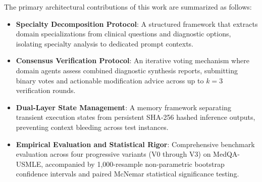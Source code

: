 The primary architectural contributions of this work are summarized as follows:
\begin{itemize}
    \item \textbf{Specialty Decomposition Protocol}: A structured framework that extracts domain specializations from clinical questions and diagnostic options, isolating specialty analysis to dedicated prompt contexts.
    \item \textbf{Consensus Verification Protocol}: An iterative voting mechanism where domain agents assess combined diagnostic synthesis reports, submitting binary votes and actionable modification advice across up to $k=3$ verification rounds.
    \item \textbf{Dual-Layer State Management}: A memory framework separating transient execution states from persistent SHA-256 hashed inference outputs, preventing context bleeding across test instances.
    \item \textbf{Empirical Evaluation and Statistical Rigor}: Comprehensive benchmark evaluation across four progressive variants (V0 through V3) on MedQA-USMLE, accompanied by 1,000-resample non-parametric bootstrap confidence intervals and paired McNemar statistical significance testing.
\end{itemize}
